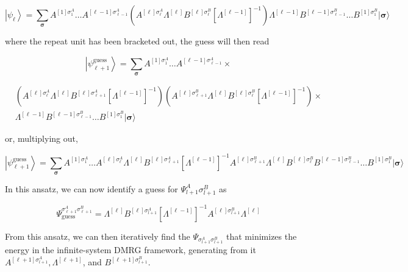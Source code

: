 \documentclass[12pt]{article}
\begin{document}
\begin{equation*}
\left|\psi_{\ell}\right\rangle=\sum_{\boldsymbol{\sigma}} A^{[1] \sigma_{1}^{A}} \ldots A^{[\ell-1] \sigma_{\ell-1}^{A}}\left(A^{[\ell] \sigma_{\ell}^{A}} \Lambda^{[\ell]} B^{[\ell] \sigma_{\ell}^{B}}\left[\Lambda^{[\ell-1]}\right]^{-1}\right) \Lambda^{[\ell-1]} B^{[\ell-1] \sigma_{\ell-1}^{B}} \ldots B^{[1] \sigma_{1}^{B}}|\boldsymbol{\sigma}\rangle \tag{335}
\end{equation*}


where the repeat unit has been bracketed out, the guess will then read

$$
\left|\psi_{\ell+1}^{\text {guess }}\right\rangle=\sum_{\boldsymbol{\sigma}} A^{[1] \sigma_{1}^{A}} \ldots A^{[\ell-1] \sigma_{\ell-1}^{A}} \times
$$


\begin{align*}
& \left(A^{[\ell] \sigma_{\ell}^{A}} \Lambda^{[\ell]} B^{[\ell] \sigma_{\ell+1}^{A}}\left[\Lambda^{[\ell-1]}\right]^{-1}\right)\left(A^{[\ell] \sigma_{\ell+1}^{B}} \Lambda^{[\ell]} B^{[\ell] \sigma_{\ell}^{B}}\left[\Lambda^{[\ell-1]}\right]^{-1}\right) \times \\
& \Lambda^{[\ell-1]} B^{[\ell-1] \sigma_{\ell-1}^{B}} \ldots B^{[1] \sigma_{1}^{B}}|\boldsymbol{\sigma}\rangle \tag{336}
\end{align*}


or, multiplying out,


\begin{equation*}
\left|\psi_{\ell+1}^{\text {guess }}\right\rangle=\sum_{\boldsymbol{\sigma}} A^{[1] \sigma_{1}^{A}} \ldots A^{[\ell] \sigma_{\ell}^{A}} \Lambda^{[\ell]} B^{[\ell] \sigma_{\ell+1}^{A}}\left[\Lambda^{[\ell-1]}\right]^{-1} A^{[\ell] \sigma_{\ell+1}^{B}} \Lambda^{[\ell]} B^{[\ell] \sigma_{\ell}^{B}} B^{[\ell-1] \sigma_{\ell-1}^{B}} \ldots B^{[1] \sigma_{1}^{B}}|\boldsymbol{\sigma}\rangle \tag{337}
\end{equation*}


In this ansatz, we can now identify a guess for $\Psi_{l+1}^{A} \sigma_{l+1}^{B}$ as


\begin{equation*}
\Psi_{\text {guess }}^{\sigma_{\ell+1}^{A} \sigma_{\ell+1}^{B}}=\Lambda^{[\ell]} B^{[\ell] \sigma_{l+1}^{A}}\left[\Lambda^{[\ell-1]}\right]^{-1} A^{[\ell] \sigma_{l+1}^{B}} \Lambda^{[\ell]} \tag{338}
\end{equation*}


From this ansatz, we can then iteratively find the $\Psi_{\sigma_{l+1}^{A} \sigma_{l+1}^{B}}$ that minimizes the energy in the infinite-system DMRG framework, generating from it $A^{[\ell+1] \sigma_{l+1}^{A}}, \Lambda^{[\ell+1]}$, and $B^{[\ell+1] \sigma_{l+1}^{B}}$.
\end{document}
